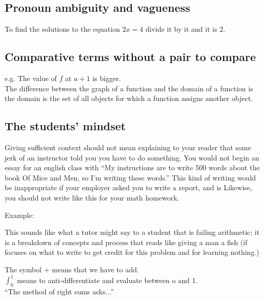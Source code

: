 \documentclass[12pt]{article}
\def\noi{\noindent}
\begin{document}
\subsection{Pronoun ambiguity and vagueness}
To find the solutions to the equation $2x=4$ divide it by it and it is 2.

\subsection{Comparative terms without a pair to compare}
e.g. The value of $f$ at $a+1$ is bigger.\\

\noi The difference between the graph of a function and the domain of a function is the domain is the set of all objects for which a function assigns another object.

\subsection{\bfseries The students' mindset}
Giving sufficient context should not mean explaining to your reader that some jerk of an instructor told you you have to do something. You would not begin an essay for an english class with ``My instructions are to write 500 words about the book Of Mice and Men, so I'm writing these words.'' 
This kind of writing would be inappropriate if your employer asked you to write a report, and is 
Likewise, you should not write like this for your math homework.

Example:\\
\begin{quote}
\end{quote}



This sounds like what a tutor might say to a student that is failing arithmetic; it is a breakdown of concepts and process that reads like 
giving a man a fish (if focuses on what to write to get credit for this problem and for learning nothing.)


The symbol $+$ means that we have to add. \\
$\int_0^1$ means to anti-differentiate and evaluate between o and 1. \\
``The method of right sums asks...''\\
\end{document}
